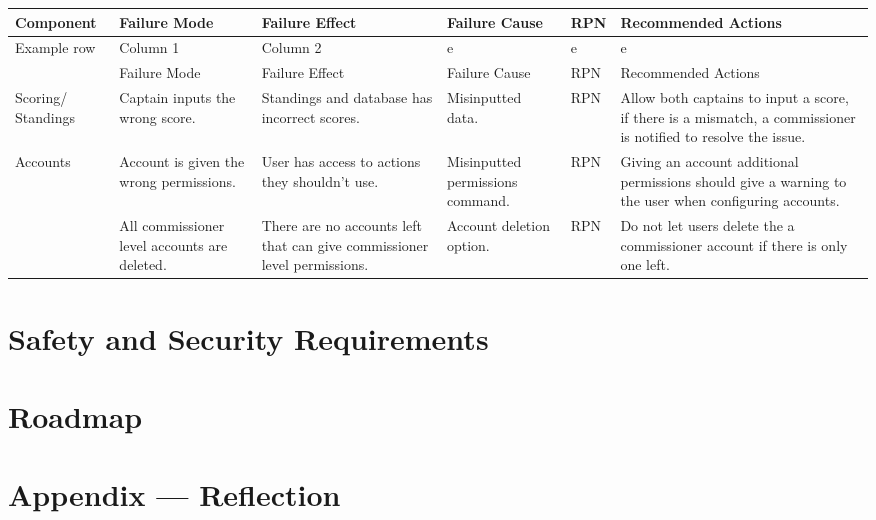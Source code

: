 \documentclass{article}
\begin{document}
\hspace*{-3.25cm}
\begin{tabularx}{504pt}{|p{2cm}||p{3cm}|p{3cm}|p{3cm}|p{1cm}|p{3cm}|}
\hline
\textbf{Component} & \textbf{Failure Mode} & \textbf{Failure Effect} & \textbf{Failure Cause} & \textbf{RPN} & \textbf{Recommended Actions}\\
\hline
\multirow{2}{2cm}{Example row} & Column 1 & Column 2 & e & e & e\\
\cline{2-6}
& Failure Mode & Failure Effect & Failure Cause & RPN & Recommended Actions\\
\hline
\multirow{1}{2cm}{Scoring/ Standings} & Captain inputs the wrong score. & 
Standings and database has incorrect scores. & Misinputted data. & RPN & Allow
both captains to input a score, if there is a mismatch, a commissioner is
notified to resolve the issue.\\
\cline{2-6}
\hline
\multirow{2}{2cm}{Accounts} & Account is given the wrong permissions. & User has access to
actions they shouldn't use. & Misinputted permissions command. & RPN & Giving
an account additional permissions should give a warning to the user when
configuring accounts.\\
\cline{2-6}
& All commissioner level accounts are deleted. & There are no
accounts left that can give commissioner level permissions. & Account deletion
option. & RPN & Do not let users delete the a commissioner account if there is
only one left.\\
\hline

\end{tabularx}



\section{Safety and Security Requirements}


\section{Roadmap}


\newpage{}

\section*{Appendix --- Reflection}
\end{document}
